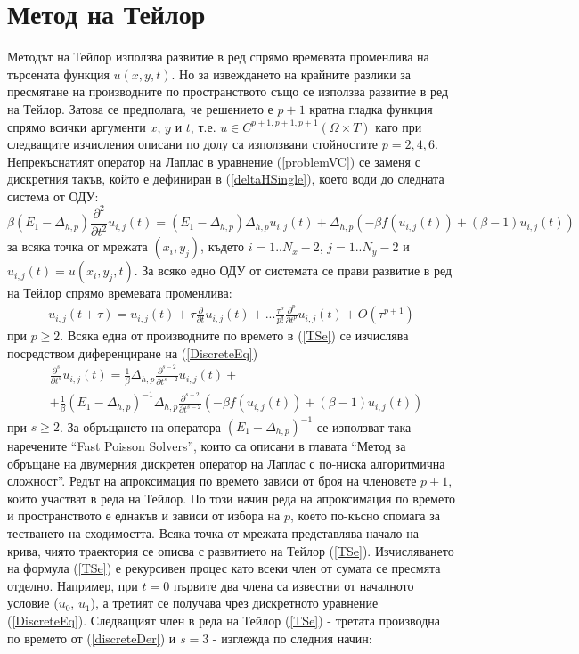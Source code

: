 \documentclass{article}
\newcommand{\be}{\begin{equation}}
\newcommand{\ee}{\end{equation}}
\newcommand{\rf}[1]{(\ref{#1})}
\begin{document}
\section{ Метод на Тейлор }
Методът на Тейлор използва развитие в ред спрямо времевата променлива на търсената функция $u(x,y,t)$. Но за извеждането на крайните разлики за пресмятане на производните по пространството също се използва развитие в ред на Тейлор. Затова се предполага, че решението е $p+1$ кратна гладка функция спрямо всички аргументи $x$, $y$ и $t$, т.е. $u \in C^{p+1,p+1,p+1}(\Omega \times T)$ като при следващите изчисления описани по долу са използвани стойностите $p=2,4,6$. Непрекъснатият оператор на Лаплас в уравнение \rf{problemVC} се заменя с дискретния такъв, който е дефиниран в \rf{deltaHSingle}, което води до следната система от ОДУ:
\be \label{DiscreteEq}
\beta (E_1-\Delta_{h,p}) \frac{\partial^2 }{\partial t^2}u_{i, j}(t)=
 (E_1 - \Delta_{h,p})\Delta_{h,p} u_{i, j}(t) + \Delta_{h,p} ( -\beta f( u_{i, j}(t) ) + (\beta-1) u_{i, j}(t) )
\ee
за всяка точка от мрежата $(x_i, y_j)$, където $i = 1..N_x-2$, $j=1..N_y-2$ и $u_{i, j}(t) = u(x_i, y_j, t)$. За всяко едно ОДУ от системата се прави развитие в ред на Тейлор спрямо времевата променлива:
\begin{align} \label{TSe}
u_{i, j}(t+\tau) = u_{i, j}(t) + \tau \frac{ \partial }{ \partial t }u_{i, j}(t)  + ... 
\frac{ \tau^p }{ p! } \frac{ \partial^p}{ \partial t^p }u_{i, j}(t) + O(\tau^{p+1})
\end{align}
при $p \ge 2$. Всяка една от производните по времето в \rf{TSe} се изчислява посредством диференциране на \rf{DiscreteEq}
\begin{align}\label{discreteDer}
&\frac{\partial^s}{\partial t^s}u_{i, j}(t)= \frac{1}{\beta} \Delta_{h,p} \frac{\partial^{s-2}}{\partial t^{s-2}} u_{i, j}(t) + \nonumber \\ 
&+\frac{1}{\beta} (E_1-\Delta_{h,p})^{-1} \Delta_{h,p} \frac{\partial^{s-2}}{\partial t^{s-2}} ( -\beta f( u_{i, j}(t) ) + (\beta-1) u_{i, j}(t) ) 
\end{align}
при $s \ge 2$. За обръщането на оператора $(E_1-\Delta_{h,p})^{-1}$ се използват така наречените ``Fast Poisson Solvers'', които са описани в главата ``Метод за обръщане на двумерния дискретен оператор на Лаплас с по-ниска алгоритмична сложност''. Редът на апроксимация по времето зависи от броя на членовете $p+1$, които участват в реда на Тейлор. По този начин реда на апроксимация по времето и пространството е еднакъв и зависи от избора на $p$, което по-късно спомага за тестването на сходимостта. Всяка точка от мрежата представлява начало на крива, чиято траектория се описва с развитието на Тейлор \rf{TSe}. Изчисляването на формула \rf{TSe} е рекурсивен процес като всеки член от сумата се пресмята отделно. Например, при $t=0$ първите два члена са известни от началното условие ($u_0$, $u_1$), а третият се получава чрез дискретното уравнение \rf{DiscreteEq}.  Следващият член в реда на Тейлор \rf{TSe} - третата производна по времето от \rf{discreteDer} и $s=3$ - изглежда по следния начин:
\end{document}
